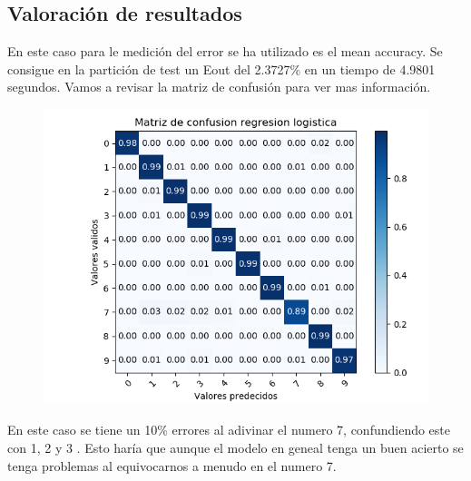 \documentclass[titlepage]{article}
\begin{document}
	\subsection{Valoración de resultados}
	En este caso para le medición del error se ha utilizado es el mean accuracy.
	Se consigue en la partición de test un Eout del 2.3727\% en un tiempo de 4.9801 segundos. Vamos a revisar la matriz de confusión para ver mas información.
	
	\begin{figure}[H]
		\centering
		\includegraphics[width=0.7\linewidth]{../imagenesRL/matrizconfusion}
		\caption{}
		\label{fig:Matriz confusion RL}
	\end{figure}

	En este caso se tiene un 10\% errores al adivinar el numero 7, confundiendo este con 1, 2 y 3 . Esto haría que aunque el modelo en geneal tenga un buen acierto se tenga problemas al equivocarnos a menudo en el numero 7.
	
	
	
\end{document}
